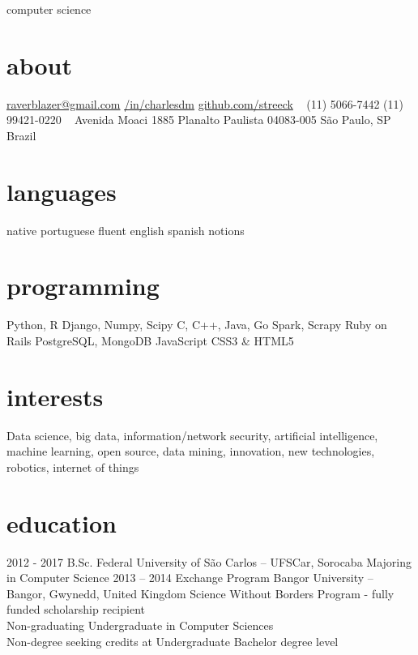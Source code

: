 \documentclass[]{friggeri-cv}
\begin{document}
       {computer science}


\begin{aside}
  \section{about}
    \href{mailto:raverblazer@gmail.com}{raverblazer@gmail.com}
    \href{http://www.linkedin.com/in/charlesdm}{\faLinkedinSign \space  /in/charlesdm}
    \href{https://github.com/streeck}{\faGithubSign \space github.com/streeck}
    ~
    (11) 5066-7442
    (11) 99421-0220
    ~
    Avenida Moaci 1885
    Planalto Paulista
    04083-005
    São Paulo, SP
    Brazil
  \section{languages}
    native portuguese
    fluent english
    spanish notions
  \section{programming}
    Python, R
    Django, Numpy, Scipy
    C, C++, Java, Go
    Spark, Scrapy
    Ruby on Rails
    PostgreSQL, MongoDB
    JavaScript
    CSS3 \& HTML5
\end{aside}

\section{interests}

Data science, big data, information/network security, artificial intelligence, machine learning, open source, data mining, innovation, new technologies, robotics, internet of things

\section{education}

\begin{entrylist}
  \entry
    {2012 - 2017}
    {B.Sc.}
    {Federal University of São Carlos -- UFSCar, Sorocaba}
    {Majoring in Computer Science}
  \entry
    {2013 – 2014}
    {Exchange Program}
    {Bangor University -- Bangor, Gwynedd, United Kingdom}
    {Science Without Borders Program - fully funded scholarship recipient \\
    Non-graduating Undergraduate in Computer Sciences \\
    Non-degree seeking credits at Undergraduate Bachelor degree level}
\end{entrylist}
\end{document}
